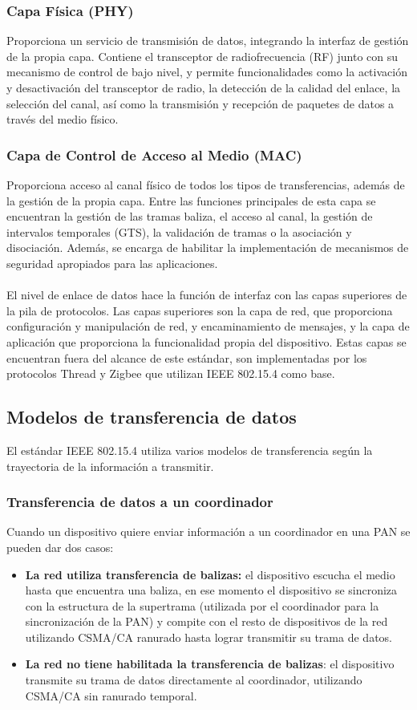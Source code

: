 \subsubsection{Capa Física (PHY)}
Proporciona un servicio de transmisión de datos, integrando la interfaz de gestión de la propia capa. Contiene el transceptor de radiofrecuencia (RF) junto con su mecanismo de control de bajo nivel, y permite funcionalidades como la activación y desactivación del transceptor de radio, la detección de la calidad del enlace, la selección del canal, así como la transmisión y recepción de paquetes de datos a través del medio físico.
\subsubsection{Capa de Control de Acceso al Medio (MAC)}
Proporciona acceso al canal físico de todos los tipos de transferencias, además de la gestión de la propia capa. Entre las funciones principales de esta capa se encuentran la gestión de las tramas baliza, el acceso al canal, la gestión de intervalos temporales (GTS), la validación de tramas o la asociación y disociación. Además, se encarga de habilitar la implementación de mecanismos de seguridad apropiados para las aplicaciones.
\\\\El nivel de enlace de datos hace la función de interfaz con las capas superiores de la pila de protocolos. Las capas superiores son la capa de red, que proporciona configuración y manipulación de red, y encaminamiento de mensajes, y la capa de aplicación que proporciona la funcionalidad propia del dispositivo. Estas capas se encuentran fuera del alcance de este estándar, son implementadas por los protocolos Thread y Zigbee que utilizan IEEE 802.15.4 como base.


\clearpage
\subsection{Modelos de transferencia de datos} %
El estándar IEEE 802.15.4 utiliza varios modelos de transferencia según la trayectoria de la información a transmitir.
\subsubsection{Transferencia de datos a un coordinador}
Cuando un dispositivo quiere enviar información a un coordinador en una PAN se pueden dar dos casos:
\begin{itemize}
\item{\bf La red utiliza transferencia de balizas:} el dispositivo escucha el medio hasta que encuentra una baliza, en ese momento el dispositivo se sincroniza con la estructura de la supertrama (utilizada por el coordinador para la sincronización de la PAN) y compite con el resto de dispositivos de la red utilizando CSMA/CA ranurado hasta lograr transmitir su trama de datos.
\item{\bf La red no tiene habilitada la transferencia de balizas}: el dispositivo transmite su trama de datos directamente al coordinador, utilizando CSMA/CA sin ranurado temporal.
\end{itemize}
